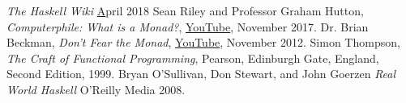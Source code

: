 \begin{thebibliography}{9}
  \textit{The Haskell Wiki}
  \href{https://wiki.haskell.org/}
  April 2018
  Sean Riley and Professor Graham Hutton,
  \textit{Computerphile: What is a Monad?},
  \href{https://youtu.be/t1e8gqXLbsU}{YouTube},
  November 2017.
  Dr. Brian Beckman,
  \textit{Don't Fear the Monad},
  \href{https://youtu.be/ZhuHCtR3xq8}{YouTube},
  November 2012.
  Simon Thompson,
  \textit{The Craft of Functional Programming},
  Pearson, Edinburgh Gate, England,
  Second Edition,
  1999.
  Bryan O'Sullivan, Don Stewart, and John Goerzen
  \textit{Real World Haskell}
  O'Reilly Media
  2008.
\end{thebibliography}
